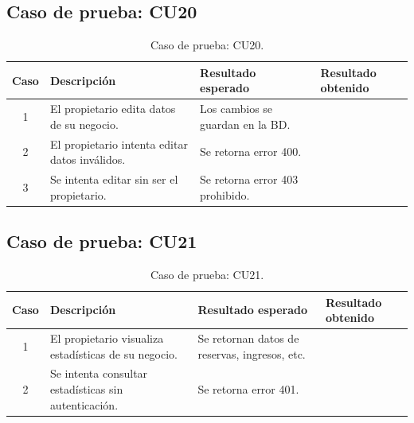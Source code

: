 
\subsection{Caso de prueba: CU20}

\begin{table}[H]
\centering
\label{tab:cu20_white_test}
\renewcommand{\arraystretch}{1.3}
\begin{tabular}{|c|p{5cm}|p{6cm}|p{2.5cm}|}
\hline
\rowcolor[RGB]{217,217,217}
\textbf{Caso} & \textbf{Descripción} & \textbf{Resultado esperado} & \textbf{Resultado obtenido} \\
\hline

1 &
El propietario edita datos de su negocio. &
Los cambios se guardan en la BD. &
 \\
\hline

2 &
El propietario intenta editar datos inválidos. &
Se retorna error 400. &
 \\
\hline

3 &
Se intenta editar sin ser el propietario. &
Se retorna error 403 prohibido. &
 \\
\hline

\end{tabular}
\caption{Caso de prueba: CU20.}
\end{table}


\subsection{Caso de prueba: CU21}

\begin{table}[H]
\centering
\label{tab:cu21_white_test}
\renewcommand{\arraystretch}{1.3}
\begin{tabular}{|c|p{5cm}|p{6cm}|p{2.5cm}|}
\hline
\rowcolor[RGB]{217,217,217}
\textbf{Caso} & \textbf{Descripción} & \textbf{Resultado esperado} & \textbf{Resultado obtenido} \\
\hline

1 &
El propietario visualiza estadísticas de su negocio. &
Se retornan datos de reservas, ingresos, etc. &
 \\
\hline

2 &
Se intenta consultar estadísticas sin autenticación. &
Se retorna error 401. &
 \\
\hline

\end{tabular}
\caption{Caso de prueba: CU21.}
\end{table}

